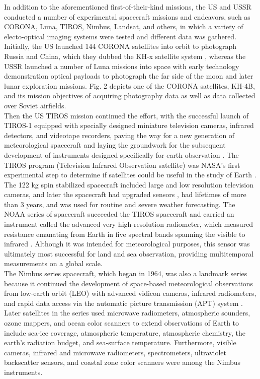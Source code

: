 \documentclass[final,5p,times,sort&compress,twocolumn]{elsarticle}
\begin{document}
In addition to the aforementioned first-of-their-kind missions, the US and USSR conducted a number of experimental spacecraft missions and endeavors, such as CORONA, Luna, TIROS, Nimbus, Landsat, and others, in which a variety of electo-optical imaging systems were tested and different data was gathered. Initially, the US launched 144 CORONA satellites into orbit to photograph Russia and China, which they dubbed the KH-x satellite system \cite{ruffner1995corona}, whereas the USSR launched a number of Luna missions into space with early technology demonstration optical payloads to photograph the far side of the moon and later lunar exploration missions. Fig. 2 depicts one of the CORONA satellites, KH-4B, and its mission objectives of acquiring photography data as well as data collected over Soviet airfields.\\
Then the US TIROS mission continued the effort, with the successful launch of TIROS-1 equipped with specially designed miniature television cameras, infrared detectors, and videotape recorders, paving the way for a new generation of meteorological spacecraft and laying the groundwork for the subsequent development of instruments designed specifically for earth observation \cite{Tatem2008FiftyYO}. The TIROS program (Television Infrared Observation satellite) was NASA's first experimental step to determine if satellites could be useful in the study of Earth \cite{neeck2005nasa}. The 122 kg spin stabilized spacecraft included large and low resolution television cameras, and later the spacecraft had upgraded sensors \cite{neeck2005nasa}, had lifetimes of more than 3 years, and was used for routine and severe weather forecasting. The NOAA series of spacecraft succeeded the TIROS spacecraft and carried an instrument called the advanced very high-resolution radiometer, which measured resistance emanating from Earth in five spectral bands spanning the visible to infrared \cite{Tatem2008FiftyYO}. Although it was intended for meteorological purposes, this sensor was ultimately most successful for land and sea observation, providing multitemporal measurements on a global scale.\\ 
The Nimbus series spacecraft, which began in 1964, was also a landmark series because it continued the development of space-based meteorological observations from low-earth orbit (LEO) with advanced vidicon cameras, infrared radiometers, and rapid data access via the automatic picture transmission (APT) system \cite{neeck2005nasa, Tatem2008FiftyYO}. Later satellites in the series used microwave radiometers, atmospheric sounders, ozone mappers, and ocean color scanners to extend observations of Earth to include sea-ice coverage, atmospheric temperature, atmospheric chemistry, the earth's radiation budget, and sea-surface temperature. Furthermore, visible cameras, infrared and microwave radiometers, spectrometers, ultraviolet backscatter sensors, and coastal zone color scanners were among the Nimbus instruments.\\
\end{document}

